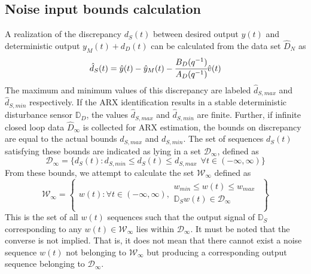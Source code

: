 \documentclass[letterpaper, 10 pt, conference]{ieeeconf}  %
\begin{document}
\begin{enumerate}
	\subsection{Noise input bounds calculation}
	\label{Noise}
	A realization of the discrepancy $d_S(t)$ between desired output $y(t)$ and deterministic output $y_M(t)+d_D(t)$ can be calculated from the data set $\hat{D}_{N}$ as 
	\begin{equation*}
	\hat{d}_S(t) = \hat{y}(t)-\hat{y}_M(t)-\cfrac{B_D(q^{-1})}{A_D(q^{-1})} \hat{v}(t) 
	\end{equation*}
	The maximum and minimum values of this discrepancy are labeled $\hat{d}_{S,max}$ and $\hat{d}_{S,min}$ respectively. If the ARX identification results in a stable deterministic disturbance sensor $\mathbb{D}_D$, the values $\hat{d}_{S,max}$ and $\hat{d}_{S,min}$ are finite. Further, if infinite closed loop data $\hat{D}_{\infty}$ is collected for ARX estimation, the bounds on discrepancy are equal to the actual bounds $d_{S,max}$ and $d_{S,min}$. The set of sequences $d_S(t)$ satisfying these bounds are indicated as lying in a set $\mathcal{D}_{\infty}$, defined as 
	\begin{equation*}
	\mathcal{D}_{\infty} = \{d_S(t): d_{S,min} \leq d_S(t) \leq d_{S,max} \hspace{5pt} \forall t \in (-\infty,\infty) \}
	\end{equation*}
	 From these bounds, we attempt to calculate the set $\mathcal{W}_{\infty}$ defined as
	\begin{equation*}
	\mathcal{W}_{\infty} = \begin{Bmatrix} w(t): \forall t \in (-\infty,\infty), \begin{matrix}
	w_{min}\leq w(t)\leq w_{max} \\ 
	\mathbb{D}_S w(t) \in \mathcal{D}_{\infty} \\
	\end{matrix} 
	\end{Bmatrix}
	\end{equation*}  
	This is the set of all $w(t)$ sequences such that the output signal of $\mathbb{D}_S$ corresponding to any $w(t)\in \mathcal{W}_{\infty}$  lies within $\mathcal{D}_{\infty}$. It must be noted that the converse is not implied. That is, it does not mean that there cannot exist a noise sequence $w(t)$ not belonging to $\mathcal{W}_{\infty}$ but producing a corresponding output sequence belonging to $\mathcal{D}_{\infty}$.
	\begin{equation*}
	\begin{matrix}

\end{matrix}
\end{equation*}
\end{enumerate}
\end{document}
